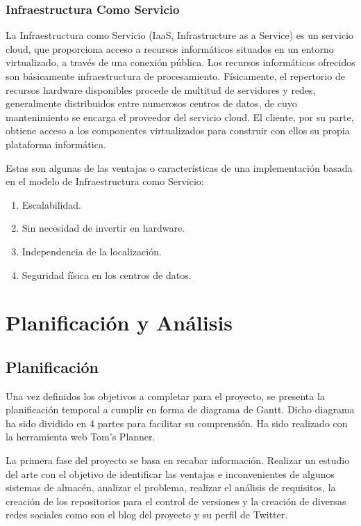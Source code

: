 \documentclass[a4paper,11pt]{book}
\begin{document}
\subsection{Infraestructura Como Servicio}
La Infraestructura como Servicio\cite{iaas} (IaaS, Infrastructure as a Service) es un servicio cloud, que proporciona acceso a recursos informáticos situados en un entorno virtualizado, a través de una conexión pública. Los recursos informáticos ofrecidos  son básicamente infraestructura de procesamiento. Físicamente, el repertorio de recursos hardware disponibles procede de multitud de servidores y redes, generalmente distribuidos entre numerosos centros de datos, de cuyo mantenimiento se encarga el proveedor del servicio cloud. El cliente, por su parte, obtiene acceso a los componentes virtualizados para construir con ellos su propia plataforma informática.

Estas son algunas de las ventajas o características de una implementación basada en el modelo de Infraestructura como Servicio:

\begin{enumerate}
\item Escalabilidad.
\item Sin necesidad de invertir en hardware.
\item Independencia de la localización.
\item Seguridad física en los centros de datos.
\end{enumerate}




\chapter{Planificación y Análisis }

\section{Planificación}

Una vez definidos los objetivos a completar para el proyecto, se presenta la planificación temporal a cumplir en forma de diagrama de Gantt. Dicho diagrama ha sido dividido en 4 partes para facilitar su comprensión. Ha sido realizado con la herramienta web Tom's Planner\cite{tomsplanner}.

La primera fase del proyecto se basa en recabar información. Realizar un estudio del arte con el objetivo de identificar las ventajas e inconvenientes de algunos sistemas de almacén, analizar el problema, realizar el análisis de requisitos, la creación de los repositorios para el control de versiones y la creación de diversas redes sociales como son el blog\cite{blog} del proyecto y su perfil\cite{twitter} de Twitter. 
\end{document}
